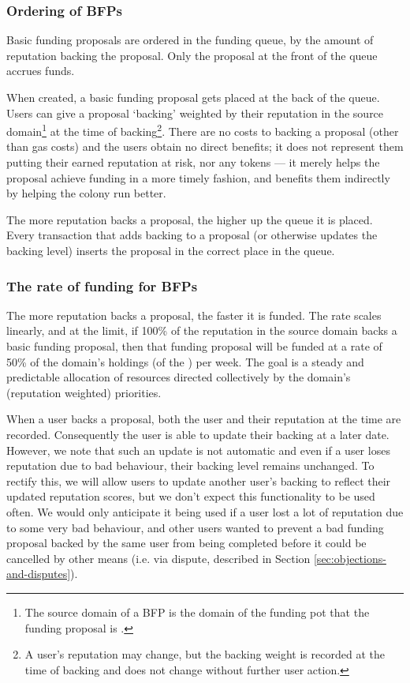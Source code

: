 \subsubsection{Ordering of BFPs}
Basic funding proposals are ordered in the funding queue, by the amount of reputation backing the proposal. Only the proposal at the front of the queue accrues funds.

When created, a basic funding proposal gets placed at the back of the queue. Users can give a proposal `backing' weighted by their reputation in the source domain\footnote{The source domain of a BFP is the domain of the funding pot that the funding proposal is .} at the time of backing\footnote{A user's reputation may change, but the backing weight is recorded at the time of backing and does not change without further user action.}. There are no costs to backing a proposal (other than gas costs) and the users obtain no direct benefits; it does not represent them putting their earned reputation at risk, nor any tokens --- it merely helps the proposal achieve funding in a more timely fashion, and benefits them indirectly by helping the colony run better.

The more reputation backs a proposal, the higher up the queue it is placed. Every transaction that adds backing to a proposal (or otherwise updates the backing level) inserts the proposal in the correct place in the queue.

\subsubsection{The rate of funding for BFPs}
The more reputation backs a proposal, the faster it is funded. The rate scales linearly, and at the limit, if 100\% of the reputation in the source domain backs a basic funding proposal, then that funding proposal will be funded at a rate of 50\% of the domain's holdings (of the ) per week. The goal is a steady and predictable allocation of resources directed collectively by the domain's (reputation weighted) priorities.

When a user backs a proposal, both the user and their reputation at the time are recorded. Consequently the user is able to update their backing at a later date. However, we note that such an update is not automatic and even if a user loses reputation due to bad behaviour, their backing level remains unchanged. To rectify this, we will allow users to update another user's backing to reflect their updated reputation scores, but we don't expect this functionality to be used often. We would only anticipate it being used if a user lost a lot of reputation due to some very bad behaviour, and other users wanted to prevent a bad funding proposal backed by the same user from being completed before it could be cancelled by other means (i.e. via dispute, described in Section \ref{sec:objections-and-disputes}).


